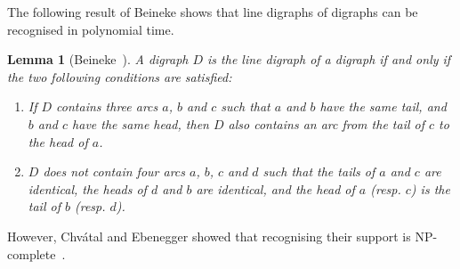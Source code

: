 \documentclass[11pt,a4aper]{article}
\newtheorem{lemma}{Lemma}[section]
\theoremstyle{definition}
\begin{document}
The following result of Beineke shows that line digraphs of digraphs can be
recognised in polynomial time.
\begin{lemma}[Beineke~\cite{beineke1968Derived}]
  A digraph $D$ is the line digraph of a digraph if and only if the two
  following conditions are satisfied:
  \begin{enumerate}
  \item If $D$ contains three arcs $a$, $b$ and $c$ such that $a$ and $b$ have
    the same tail, and $b$ and $c$ have the same head, then $D$ also contains an
    arc from the tail of $c$ to the head of $a$.
  \item $D$ does not contain four arcs $a$, $b$, $c$ and $d$ such that the tails
    of $a$ and $c$ are identical, the heads of $d$ and $b$ are identical, and
    the head of $a$ (resp. $c$) is the tail of $b$ (resp. $d$).  
  \end{enumerate}
\end{lemma}

However, Chv\'atal and Ebenegger showed that recognising their support is
NP-complete~\cite{chvatal1990Note}.
\end{document}
